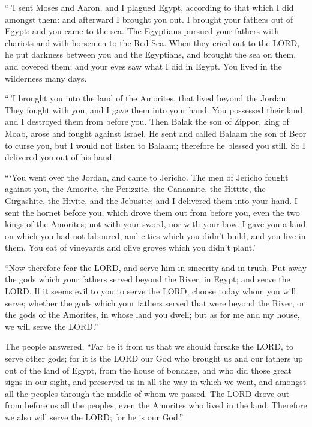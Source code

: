  ``\,'I sent Moses and Aaron, and I plagued Egypt,
according to that which I did amongst them: and afterward I brought you
out.  I brought your fathers out of Egypt: and you came to
the sea. The Egyptians pursued your fathers with chariots and with
horsemen to the Red Sea.  When they cried out to the LORD,
he put darkness between you and the Egyptians, and brought the sea on
them, and covered them; and your eyes saw what I did in Egypt. You lived
in the wilderness many days.

 ``\,'I brought you into the land of the Amorites, that
lived beyond the Jordan. They fought with you, and I gave them into your
hand. You possessed their land, and I destroyed them from before you.
 Then Balak the son of Zippor, king of Moab, arose and
fought against Israel. He sent and called Balaam the son of Beor to
curse you,  but I would not listen to Balaam; therefore
he blessed you still. So I delivered you out of his hand.

 ```You went over the Jordan, and came to Jericho. The
men of Jericho fought against you, the Amorite, the Perizzite, the
Canaanite, the Hittite, the Girgashite, the Hivite, and the Jebusite;
and I delivered them into your hand.  I sent the hornet
before you, which drove them out from before you, even the two kings of
the Amorites; not with your sword, nor with your bow.  I
gave you a land on which you had not laboured, and cities which you
didn't build, and you live in them. You eat of vineyards and olive
groves which you didn't plant.'

 ``Now therefore fear the LORD, and serve him in
sincerity and in truth. Put away the gods which your fathers served
beyond the River, in Egypt; and serve the LORD.  If it
seems evil to you to serve the LORD, choose today whom you will serve;
whether the gods which your fathers served that were beyond the River,
or the gods of the Amorites, in whose land you dwell; but as for me and
my house, we will serve the LORD.''

 The people answered, ``Far be it from us that we should
forsake the LORD, to serve other gods;  for it is the
LORD our God who brought us and our fathers up out of the land of Egypt,
from the house of bondage, and who did those great signs in our sight,
and preserved us in all the way in which we went, and amongst all the
peoples through the middle of whom we passed.  The LORD
drove out from before us all the peoples, even the Amorites who lived in
the land. Therefore we also will serve the LORD; for he is our God.''

